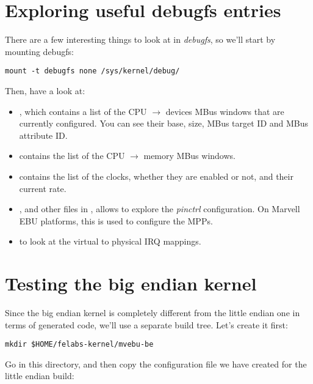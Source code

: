\section{Exploring useful debugfs entries}

There are a few interesting things to look at in {\em debugfs}, so
we'll start by mounting debugfs:

\begin{verbatim}
mount -t debugfs none /sys/kernel/debug/
\end{verbatim}

Then, have a look at:

\begin{itemize}
\item {}, which contains a
  list of the CPU $\rightarrow$ devices MBus windows that are
  currently configured. You can see their base, size, MBus target ID
  and MBus attribute ID.
\item {} contains the list of
  the CPU $\rightarrow$ memory MBus windows.
\item {} contains the list of
  the clocks, whether they are enabled or not, and their current rate.
\item
  ,
  and other files in
  , allows to
  explore the {\em pinctrl} configuration. On Marvell EBU platforms,
  this is used to configure the MPPs.
\item {} to look at the virtual to
  physical IRQ mappings.
\end{itemize}

\section{Testing the big endian kernel}

Since the big endian kernel is completely different from the little
endian one in terms of generated code, we'll use a separate build
tree. Let's create it first:

\begin{verbatim}
mkdir $HOME/felabs-kernel/mvebu-be
\end{verbatim}

Go in this directory, and then copy the configuration file we have
created for the little endian build:

